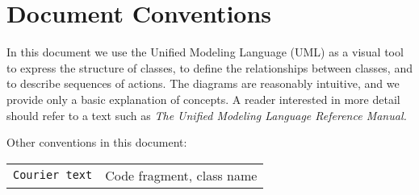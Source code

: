 \section{Document Conventions}

In this document we use the Unified Modeling Language (UML) as a visual tool 
to express the structure of 
classes, to define the relationships between classes, and to describe sequences
of actions.  The diagrams are reasonably intuitive, and we provide 
only a basic explanation of concepts.  A reader interested in more detail should 
refer to a text such as {\it The Unified Modeling Language Reference Manual.}

Other conventions in this document: 
\begin{tabular}{ll}
{\tt Courier text} & {Code fragment, class name} \\
\end{tabular}








